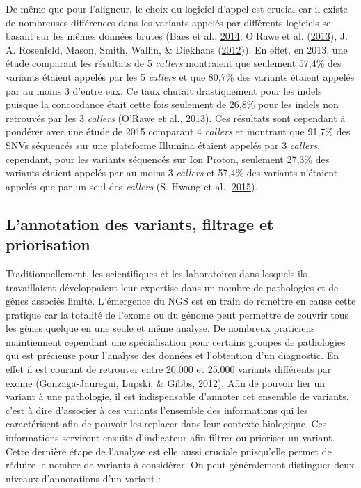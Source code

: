 \documentclass[12pt,twoside]{reedthesis}
\theoremstyle{definition}
\theoremstyle{definition}
\theoremstyle{remark}
\begin{document}
  De même que pour l'aligneur, le choix du logiciel d'appel est crucial
  car il existe de nombreuses différences dans les variants appelés par
  différents logiciels se basant sur les mêmes données brutes (Baes et
  al., \protect\hyperlink{ref-Baes2014}{2014}, O'Rawe et al.
  (\protect\hyperlink{ref-ORawe2013}{2013}), J. A. Rosenfeld, Mason,
  Smith, Wallin, \& Diekhans
  (\protect\hyperlink{ref-Rosenfeld2012}{2012})). En effet, en 2013, une
  étude comparant les résultats de 5 \emph{callers} montraient que
  seulement 57,4\% des variants étaient appelés par les 5 \emph{callers}
  et que 80,7\% des variants étaient appelés par au moins 3 d'entre eux.
  Ce taux chutait drastiquement pour les indels puisque la concordance
  était cette fois seulement de 26,8\% pour les indels non retrouvés par
  les 3 \emph{callers} (O'Rawe et al.,
  \protect\hyperlink{ref-ORawe2013}{2013}). Ces résultats sont cependant à
  pondérer avec une étude de 2015 comparant 4 \emph{callers} et montrant
  que 91,7\% des SNVs séquencés sur une plateforme Illumina étaient
  appelés par 3 \emph{callers}, cependant, pour les variants séquencés sur
  Ion Proton, seulement 27,3\% des variants étaient appelés par au moins 3
  \emph{callers} et 57,4\% des variants n'étaient appelés que par un seul
  des \emph{callers} (S. Hwang et al.,
  \protect\hyperlink{ref-Hwang2015}{2015}).
  
  \newpage
  
  \subsection{L'annotation des variants, filtrage et
  priorisation}\label{lannotation-des-variants-filtrage-et-priorisation}
  
  Traditionnellement, les scientifiques et les laboratoires dans lesquels
  ils travaillaient développaient leur expertise dans un nombre de
  pathologies et de gènes associés limité. L'émergence du NGS est en train
  de remettre en cause cette pratique car la totalité de l'exome ou du
  génome peut permettre de couvrir tous les gènes quelque en une seule et
  même analyse. De nombreux praticiens maintiennent cependant une
  spécialisation pour certains groupes de pathologies qui est précieuse
  pour l'analyse des données et l'obtention d'un diagnostic. En effet il
  est courant de retrouver entre 20.000 et 25.000 variants différents par
  exome (Gonzaga-Jauregui, Lupski, \& Gibbs,
  \protect\hyperlink{ref-Gonzaga-Jauregui2012}{2012}). Afin de pouvoir
  lier un variant à une pathologie, il est indispensable d'annoter cet
  ensemble de variants, c'est à dire d'associer à ces variants l'ensemble
  des informations qui les caractérisent afin de pouvoir les replacer dans
  leur contexte biologique. Ces informations serviront ensuite
  d'indicateur afin filtrer ou prioriser un variant. Cette dernière étape
  de l'analyse est elle aussi cruciale puisqu'elle permet de réduire le
  nombre de variants à considérer. On peut généralement distinguer deux
  niveaux d'annotations d'un variant :
  
\end{document}
